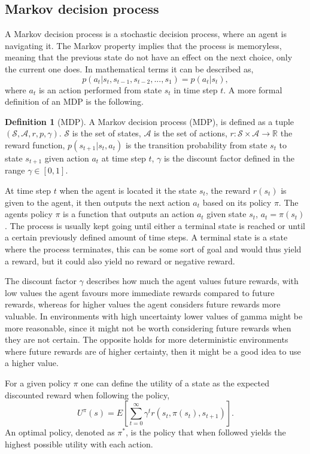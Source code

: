 \documentclass[12pt,A4]{report}
\theoremstyle{definition}
\newtheorem{definition}{Definition}[section]
\begin{document}
\subsection{Markov decision process}
A Markov decision process is a stochastic decision process, where an agent is navigating it. The Markov property implies that the process is memoryless, meaning that the previous state do not have an effect on the next choice, only the current one does. In mathematical terms it can be described as,
\[ p(a_t|s_t, s_{t-1}, s_{t-2}, ... , s_1) = p(a_t|s_t),\]
where $a_t$ is an action performed from state $s_t$ in time step $t$. A more formal definition of an MDP is the following. 
\begin{definition}[MDP]
    A Markov decision process (MDP), is defined as a tuple $(\mathcal{S}, \mathcal{A}, r, p, \gamma)$. $\mathcal{S}$ is the set of states, $\mathcal{A}$ is the set of actions, $r: \mathcal{S} \times \mathcal{A} \rightarrow \mathbb{R}$ the reward function, $p(s_{t+1}|s_t, a_t)$ is the transition probability from state $s_t$ to state $s_{t+1}$ given action $a_t$ at time step $t$, $\gamma$ is the discount factor defined in the range $\gamma \in [0, 1]$.
\end{definition}

At time step $t$ when the agent is located it the state $s_t$, the reward $r(s_t)$ is given to the agent, it then outputs the next action $a_t$ based on its policy $\pi$. The agents policy $\pi$ is a function that outputs an action $a_t$ given state $s_t$, $a_t = \pi(s_t)$. The process is usually kept going until either a terminal state is reached or until a certain previously defined amount of time steps. A terminal state is a state where the process terminates, this can be some sort of goal and would thus yield a reward, but it could also yield no reward or negative reward.

The discount factor $\gamma$ describes how much the agent values future rewards, with low values the agent favours more immediate rewards compared to future rewards, whereas for higher values the agent considers future rewards more valuable. In environments with high uncertainty lower values of gamma might be more reasonable, since it might not be worth considering future rewards when they are not certain. The opposite holds for more deterministic environments where future rewards are of higher certainty, then it might be a good idea to use a higher value.

For a given policy $\pi$ one can define the utility of a state as the expected discounted reward when following the policy,
\[ U^\pi (s) = E \left [ \sum_{t=0}^\infty \gamma^t r(s_t, \pi(s_t), s_{t+1}) \right ]. \]
An optimal policy, denoted as $\pi^*$, is the policy that when followed yields the highest possible utility with each action.
\end{document}
